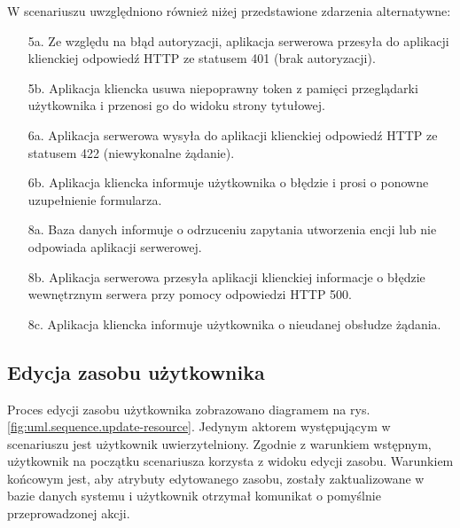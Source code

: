 W scenariuszu uwzględniono również niżej przedstawione zdarzenia alternatywne:

\begin{enumerate}
    \item [5a.] Ze względu na błąd autoryzacji, aplikacja serwerowa przesyła do aplikacji klienckiej odpowiedź HTTP ze statusem 401 (brak autoryzacji).
    \item [5b.] Aplikacja kliencka usuwa niepoprawny token z pamięci przeglądarki użytkownika i przenosi go do widoku strony tytułowej.
    \item [6a.] Aplikacja serwerowa wysyła do aplikacji klienckiej odpowiedź HTTP ze statusem 422 (niewykonalne żądanie).
    \item [6b.] Aplikacja kliencka informuje użytkownika o błędzie i prosi o ponowne uzupełnienie formularza.
    \item [8a.] Baza danych informuje o odrzuceniu zapytania utworzenia encji lub nie odpowiada aplikacji serwerowej. 
    \item [8b.] Aplikacja serwerowa przesyła aplikacji klienckiej informacje o błędzie wewnętrznym serwera przy pomocy odpowiedzi HTTP 500. 
    \item [8c.] Aplikacja kliencka informuje użytkownika o nieudanej obsłudze żądania.
\end{enumerate}

\subsection{Edycja zasobu użytkownika}

Proces edycji zasobu użytkownika zobrazowano diagramem na rys. \ref{fig:uml.sequence.update-resource}. Jedynym aktorem występującym w scenariuszu jest użytkownik uwierzytelniony. Zgodnie z warunkiem wstępnym, użytkownik na początku scenariusza korzysta z widoku edycji zasobu. Warunkiem końcowym jest, aby atrybuty edytowanego zasobu, zostały zaktualizowane w bazie danych systemu i użytkownik otrzymał komunikat o pomyślnie przeprowadzonej akcji.

